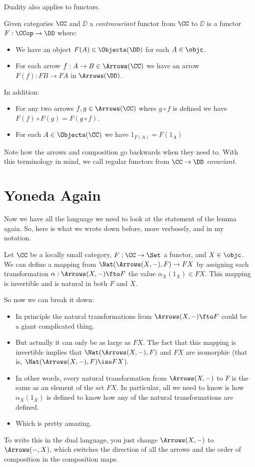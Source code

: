 Duality also applies to functors.

\begin{defn}
Given categories $\CC$ and $\DD$ a {\it contravariant} functor from $\CC$ to $\DD$ is a
functor $F: \CCop \to \DD$ where:
\begin{itemize}
\item We have an object $F(A) \in \Objects(\DD)$ for each $A \in \objc$.
\item For each arrow $f : A \to B \in \Arrows(\CC)$ we have an arrow $F(f): FB \to FA$ in $\Arrows(\DD)$.
\end{itemize}
\noindent
In addition:
\begin{itemize}
\item For any two arrows $f, g \in \Arrows(\CC)$ where $g \circ f$ is defined we have
$F(f) \circ F(g) = F(g \circ f)$.
\item For each $A \in \Objects(\CC)$ we have $1_{F(A)} = F(1_A)$
\end{itemize}

\end{defn}
\noindent
Note how the arrows and composition go backwards when they need to. With this terminology
in mind, we call regular functors from $\CC \to \DD$ {\it covariant}.

\section{Yoneda Again}

Now we have all the language we need to look at the statement of the lemma again. So, here
is what we wrote down before, more verbosely, and in my notation.

\begin{lemma}[Yoneda]\label{yoneda} Let $\CC$ be a locally small category, $F:\CC \to
\Set$ a functor, and $X \in \objc$. We can define a mapping from $\Nat(\Arrows(X, -),F)
\to FX$ by assigning each transformation $\alpha: \Arrows(X, -) \fto F$ the value
$\alpha_X(1_X) \in FX$. This mapping is invertible and is natural in both $F$ and $X$.
\end{lemma}
\noindent
So now we can break it down:
\begin{itemize}
\item In principle the natural transformations from $\Arrows(X, -) \fto F$ could be a
giant complicated thing.
\item But actually it can only be as large as $FX$. The fact that this mapping is
invertible implies that $\Nat(\Arrows(X, -),F)$ and  $FX$ are isomorphic (that is,
$\Nat(\Arrows(X, -),F) \iso FX$).
\item In other words, every natural transformation from $\Arrows(X, -)$ to $F$ is the same
as an element of the set $FX$. In particular, all we need to know is how $\alpha_X(1_X)$
is defined to know how any of the natural transformations are defined.
\item Which is pretty amazing.
\end{itemize}
To write this in the dual language, you just change $\Arrows(X, -)$ to $\Arrows(-, X)$,
which switches the direction of all the arrows and the order of composition in the
composition maps.

